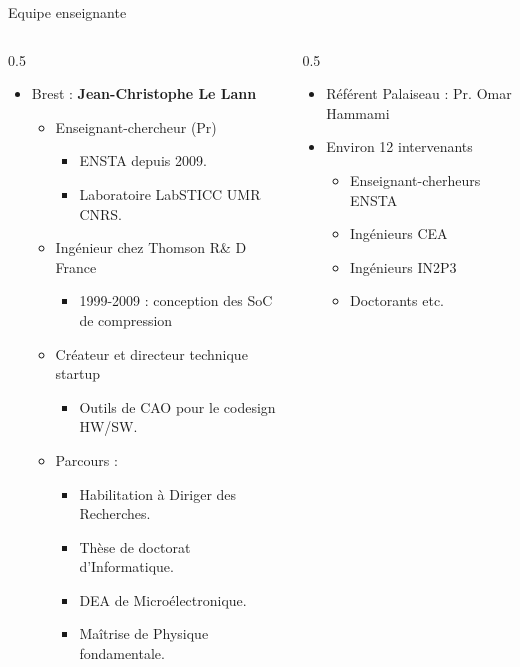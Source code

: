 \begin{frame}{Equipe enseignante}
  \begin{columns}
    \begin{column}[T]{0.5\textwidth}
      \begin{itemize}
        \item Brest : \textbf{Jean-Christophe Le Lann}
        \begin{itemize}
          \item Enseignant-chercheur (Pr)
          \begin{itemize}
            \item ENSTA depuis 2009.
            \item Laboratoire LabSTICC UMR CNRS.
          \end{itemize}
          \item Ingénieur chez Thomson R\& D France
          \begin{itemize}
            \item 1999-2009 : conception des SoC de compression
          \end{itemize}
          \item Créateur et directeur technique startup
          \begin{itemize}
            \item Outils de CAO pour le codesign HW/SW.
          \end{itemize}
          \item Parcours :
          \begin{itemize}
            \item Habilitation à Diriger des Recherches.
            \item Thèse de doctorat d'Informatique.
            \item DEA de Microélectronique.
            \item Maîtrise de Physique fondamentale.
          \end{itemize}
        \end{itemize}
      \end{itemize}
    \end{column}
    \begin{column}[T]{0.5\textwidth}
      \begin{itemize}
        \item Référent Palaiseau : Pr. Omar Hammami
        \item Environ 12 intervenants
        \begin{itemize}
          \item Enseignant-cherheurs ENSTA
          \item Ingénieurs CEA
          \item Ingénieurs IN2P3
          \item Doctorants etc.
        \end{itemize}
      \end{itemize}
    \end{column}
  \end{columns}


\end{frame}
